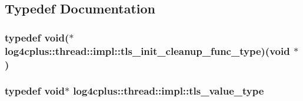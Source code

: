 \subsection{Typedef Documentation}
\hypertarget{namespacelog4cplus_1_1thread_1_1impl_a4a2c43d8790236ed72370694f70a08c2}{
\subsubsection[{tls\-\_\-init\-\_\-cleanup\-\_\-func\-\_\-type}]{\setlength{\rightskip}{0pt plus 5cm}typedef void($\ast$  log4cplus\-::thread\-::impl\-::tls\-\_\-init\-\_\-cleanup\-\_\-func\-\_\-type)(void $\ast$)}}\label{namespacelog4cplus_1_1thread_1_1impl_a4a2c43d8790236ed72370694f70a08c2}
\hypertarget{namespacelog4cplus_1_1thread_1_1impl_a7964c384af774778b462bec9cc6581ea}{
\subsubsection[{tls\-\_\-value\-\_\-type}]{\setlength{\rightskip}{0pt plus 5cm}typedef void$\ast$ {\bf log4cplus\-::thread\-::impl\-::tls\-\_\-value\-\_\-type}}}\label{namespacelog4cplus_1_1thread_1_1impl_a7964c384af774778b462bec9cc6581ea}


